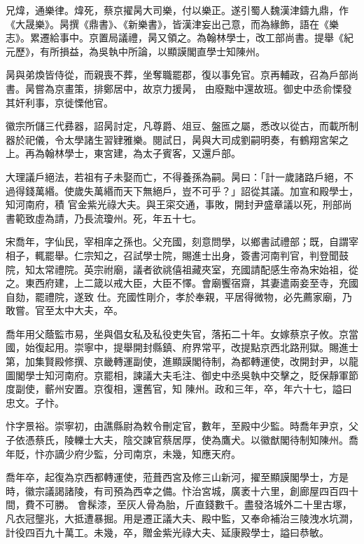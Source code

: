 \begin{pinyinscope}
 兄煒，通樂律。煒死，蔡京擢昺大司樂，付以樂正。遂引蜀人魏漢津鑄九鼎，作《大晟樂》。昺撰《鼎書》、《新樂書》，皆漢津妄出己意，而為緣飾，語在《樂志》。累遷給事中。京置局議禮，昺又領之。為翰林學士，改工部尚書。提舉《紀元歷》，有所損益，為吳執中所論，以顯謨閣直學士知陳州。



 昺與弟煥皆侍從，而親喪不葬，坐奪職罷郡，復以事免官。京再輔政，召為戶部尚書。昺嘗為京畫策，排鄭居中，故京力援昺，
 由廢黜中還故班。御史中丞俞慄發其奸利事，京徙慄他官。



 徽宗所儲三代彞器，詔昺討定，凡尊爵、俎豆、盤匜之屬，悉改以從古，而載所制器於祀儀，令太學諸生習肄雅樂。閱試日，昺與大司成劉嗣明奏，有鶴翔宮架之上。再為翰林學士，東宮建，為太子賓客，又還戶部。



 大理議戶絕法，若祖有子未娶而亡，不得養孫為嗣。昺曰：「計一歲諸路戶絕，不過得錢萬緡。使歲失萬緡而天下無絕戶，豈不可乎？」詔從其議。加宣和殿學士，知河南府，積
 官金紫光祿大夫。與王寀交通，事敗，開封尹盛章議以死，刑部尚書範致虛為請，乃長流瓊州。死，年五十七。



 宋喬年，字仙民，宰相庠之孫也。父充國，刻意問學，以鄉書試禮部；既，自謂宰相子，輒罷舉。仁宗知之，召試學士院，賜進士出身，簽書河南判官，判登聞鼓院，知太常禮院。英宗祔廟，議者欲祧僖祖藏夾室，充國請配感生帝為宋始祖，從之。東西府建，上二箴以戒大臣，大臣不懌。會廟饗宿齋，其妻遣兩妾至寺，充國自劾，罷禮院，遂致
 仕。充國性剛介，孝於奉親，平居得微物，必先薦家廟，乃敢嘗。官至太中大夫，卒。



 喬年用父蔭監市易，坐與倡女私及私役吏失官，落拓二十年。女嫁蔡京子攸。京當國，始復起用。崇寧中，提舉開封縣鎮、府界常平，改提點京西北路刑獄。賜進士第，加集賢殿修撰、京畿轉運副使，進顯謨閣待制，為都轉運使，改開封尹，以龍圖閣學士知河南府。京罷相，諫議大夫毛注、御史中丞吳執中交擊之，貶保靜軍節度副使，蘄州安置。京復相，還舊官，知
 陳州。政和三年，卒，年六十七，謚曰忠文。子忭。



 忭字景裕。崇寧初，由譙縣尉為敕令刪定官，數年，至殿中少監。時喬年尹京，父子依憑蔡氏，陵轢士大夫，陰交諫官蔡居厚，使為鷹犬。以徽猷閣待制知陳州。喬年貶，忭亦謫少府少監，分司南京，未幾，知應天府。



 喬年卒，起復為京西都轉運使，蒞葺西宮及修三山新河，擢至顯謨閣學士，方是時，徽宗議謁諸陵，有司預為西幸之備。忭治宮城，廣袤十六里，創廊屋四百四十間，費不可勝。
 會髹漆，至灰人骨為胎，斤直錢數千。盡發洛城外二十里古塚，凡衣冠壟兆，大抵遭暴掘。用是遷正議大夫、殿中監，又奉命補治三陵洩水坑澗，計役四百九十萬工。未幾，卒，贈金紫光祿大夫、延康殿學士，謚曰恭敏。




\end{pinyinscope}
